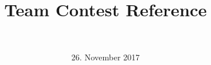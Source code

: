 \documentclass{article}
\title{Team Contest Reference}
\author{\teamname \\ \university}
\date{26. November 2017}
\begin{document}
\maketitle
\setlength{\columnsep}{1cm}

\begin{multicols*}{2}
  
  
  
  
  
  
\end{multicols*}
\end{document}
